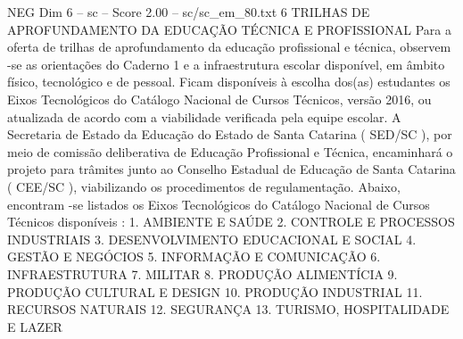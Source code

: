 \begin{textsample}{NEG Dim 6 – sc – Score 2.00 – sc/sc\_em\_80.txt}  \label{ex:f6_neg_275}
6 TRILHAS DE APROFUNDAMENTO DA EDUCAÇÃO TÉCNICA E PROFISSIONAL Para a oferta de trilhas de aprofundamento da educação profissional e técnica, observem -se as orientações do Caderno 1 e a infraestrutura escolar disponível, em âmbito físico, tecnológico e de pessoal.
Ficam disponíveis à escolha dos(as) estudantes os Eixos Tecnológicos do Catálogo Nacional de Cursos Técnicos, versão 2016, ou atualizada de acordo com a viabilidade verificada pela equipe escolar.
A Secretaria de Estado da Educação do Estado de Santa Catarina ( SED/SC ), por meio de comissão deliberativa de Educação Profissional e Técnica, encaminhará o projeto para trâmites junto ao Conselho Estadual de Educação de Santa Catarina ( CEE/SC ), viabilizando os procedimentos de regulamentação.
Abaixo, encontram -se listados os Eixos Tecnológicos do Catálogo Nacional de Cursos Técnicos disponíveis : 1.
AMBIENTE E SAÚDE 2.
CONTROLE E PROCESSOS INDUSTRIAIS 3.
DESENVOLVIMENTO EDUCACIONAL E SOCIAL 4.
GESTÃO E NEGÓCIOS 5.
INFORMAÇÃO E COMUNICAÇÃO 6.
INFRAESTRUTURA 7.
MILITAR 8.
PRODUÇÃO ALIMENTÍCIA 9.
PRODUÇÃO CULTURAL E DESIGN 10.
PRODUÇÃO INDUSTRIAL 11.
RECURSOS NATURAIS 12.
SEGURANÇA 13.
TURISMO, HOSPITALIDADE E LAZER

\end{textsample}
